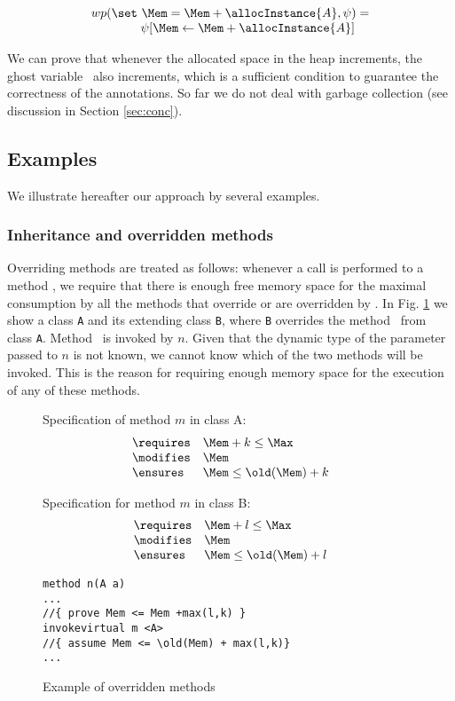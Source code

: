 $$
\begin{array}{l}
wp(\set \ \Mem = \Mem + \allocInstance{A}, \psi) = \\
\ \ \ \ \ \ \ \ \ \ \ \ \psi[ \Mem \leftarrow \Mem + \allocInstance{A} ]
\end{array}
$$

We can prove that whenever the allocated space in the heap increments, 
the ghost variable \Mem\ also increments, which is a sufficient condition to guarantee the correctness of the annotations. 
So far we do not deal with garbage collection (see discussion in Section \ref{sec:conc}).

\subsection{Examples}
We illustrate hereafter our approach by several examples. 

\subsubsection{Inheritance and overridden methods} Overriding methods are treated as follows: whenever a call is performed to a method \method,
we require that there is enough free memory space for the maximal
consumption by all the  methods that override or are overridden by
\method. In Fig. \ref{classExt} we show a class \verb!A! and its
extending class \verb!B!, where \verb!B! overrides the method \method\ from class \verb!A!. Method \method\ is invoked by $n$. Given that the dynamic type of the parameter passed to $n$ is not known, we cannot know which of the two
methods will be invoked. This is the reason for requiring enough memory space for the execution of any of these methods.

\begin{figure}[!htp]
Specification of method $m$ in class A:
$$
\begin{array}{ll}
\requires & \Mem + k  \leq \Max \\
\modifies & \Mem \\
\ensures & \Mem  \leq \old(\Mem) + k
\end{array}
$$

Specification for method $m$ in class B:
$$
\begin{array}{ll}
\requires & \Mem + l  \leq \Max \\
\modifies & \Mem \\
\ensures & \Mem  \leq \old(\Mem) + l
\end{array}
$$

\begin{verbatim}
method n(A a)
...
//{ prove Mem <= Mem +max(l,k) }
invokevirtual m <A>
//{ assume Mem <= \old(Mem) + max(l,k)}
...
\end{verbatim}
\caption{\sc Example of overridden methods}
\label{classExt}
\end{figure}


